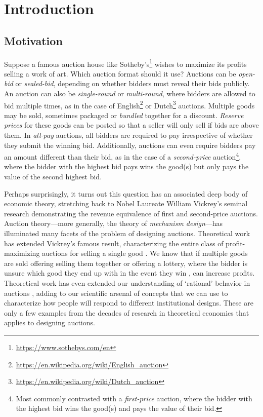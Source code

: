 \chapter{Introduction}

\section{Motivation}

Suppose a famous auction house like Sotheby's\footnote{\url{https://www.sothebys.com/en}} wishes to maximize its profits selling a work of art. Which auction format should it use? Auctions can be \textit{open-bid} or \textit{sealed-bid}, depending on whether bidders must reveal their bids publicly. An auction can also be \textit{single-round} or \textit{multi-round}, where bidders are allowed to bid multiple times, as in the case of English\footnote{\url{https://en.wikipedia.org/wiki/English_auction}} or Dutch\footnote{\url{https://en.wikipedia.org/wiki/Dutch_auction}} auctions. Multiple goods may be sold, sometimes packaged or \textit{bundled} together for a discount. \textit{Reserve prices} for these goods can be posted so that a seller will only sell if bids are above them. In \textit{all-pay} auctions, all bidders are required to pay irrespective of whether they submit the winning bid. Additionally, auctions can even require bidders pay an amount different than their bid, as in the case of a \textit{second-price} auction\footnote{Most commonly contrasted with a \textit{first-price} auction, where the bidder with the highest bid wins the good(s) and pays the value of their bid.}, where the bidder with the highest bid pays wins the good(s) but only pays the value of the second highest bid.

Perhaps surprisingly, it turns out this question has an associated deep body of economic theory, stretching back to Nobel Laureate William Vickrey's \autocite*{vickrey1961} seminal research demonstrating the revenue equivalence of first and second-price auctions. Auction theory---more generally, the theory of \textit{mechanism design}---has illuminated many facets of the problem of designing auctions. Theoretical work has extended Vickrey's famous result, characterizing the entire class of profit-maximizing auctions for selling a single good \autocite{myerson1981optimal}. We know that if multiple goods are sold offering selling them together \autocite{adams1976} or offering a lottery, where the bidder is unsure which good they end up with in the event they win \autocite{thanassoulis2004}, can increase profits. Theoretical work has even extended our understanding of `rational' behavior in auctions \autocite{li2017}, adding to our scientific arsenal of concepts that we can use to characterize how people will respond to different institutional designs. These are only a few examples from the decades of research in theoretical economics that applies to designing auctions.

